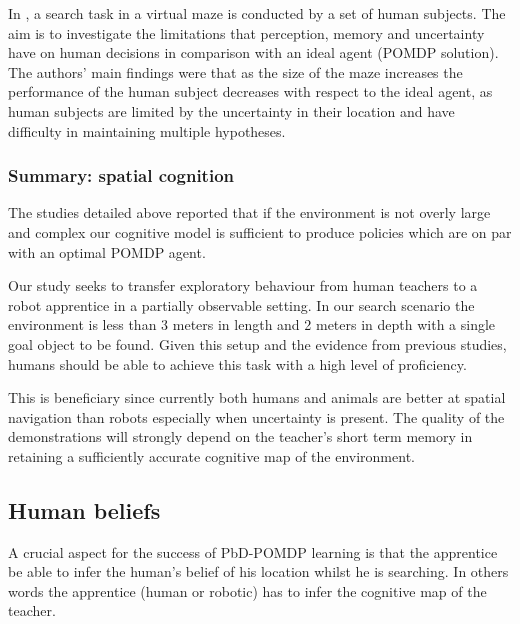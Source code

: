 In \cite{stankiewicz2006lost}, a search task in a virtual maze is conducted by a set of human subjects.  The aim 
is to investigate the limitations that perception, memory and uncertainty have on human decisions in comparison 
with an ideal agent (POMDP solution). The authors' main findings were that as the size of the maze increases the
performance of the human subject decreases with respect to the ideal agent, as human subjects are limited by the 
uncertainty in their location and have difficulty in maintaining multiple hypotheses.

\subsubsection{Summary: spatial cognition}


The studies detailed above reported that if the environment is not overly large and complex our cognitive model is sufficient 
to produce policies which are on par with an optimal POMDP agent. 

Our study seeks to transfer exploratory behaviour from human teachers to a robot apprentice in a partially observable setting. 
In our search scenario the environment is less than 3 meters in length and 2 meters in depth with a single goal object to be found. 
Given this setup and the evidence from previous studies, humans should be able to achieve this task with a high level of proficiency. 

This is beneficiary since currently both humans and animals are better at spatial navigation than robots \cite{stankiewicz2006lost} 
especially when uncertainty is present. The quality of the demonstrations will strongly depend on the teacher's short term memory 
in retaining a sufficiently accurate cognitive map of the environment. 


\subsection{Human beliefs}


A crucial aspect for the success of PbD-POMDP learning is that the apprentice be able to infer 
the human's belief of his location whilst he is searching. In others words the apprentice
(human or robotic) has to infer the cognitive map of the teacher. 


